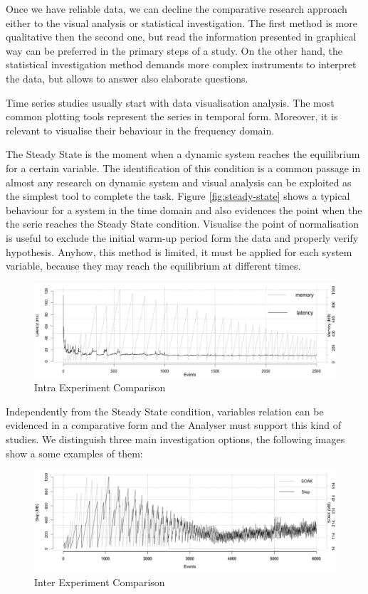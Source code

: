 Once we have reliable data, we can decline the comparative research approach either to the visual analysis or statistical investigation. The first method is more qualitative then the second one, but read the information presented in graphical way can be preferred in the primary steps of a study. On the other hand, the statistical investigation method demands more complex instruments to interpret the data, but allows to answer also elaborate questions.

Time series studies usually start with data visualisation analysis. The most common plotting tools represent the series in temporal form. Moreover, it is relevant to visualise their behaviour in the frequency domain. 

The Steady State is the moment when a dynamic system reaches the equilibrium for a certain variable. The identification of this condition is a common passage in almost any research on dynamic system and visual analysis can be exploited as the simplest tool to complete the task. Figure \ref{fig:steady-state} shows a typical behaviour for a system in the time domain and also evidences the point when the the serie reaches the Steady State condition. Visualise the point of normalisation is useful to exclude the initial warm-up period form the data and properly verify hypothesis. Anyhow, this method is limited, it must be applied for each system variable, because they may reach the equilibrium at different times.

\begin{figure}[tbh]
  \centering
	\includegraphics[width=0.80\linewidth]{images/comp-intra}
	\caption{Intra Experiment Comparison} 
  	\label{fig:comp-intra}
\end{figure}

Independently from the Steady State condition, variables relation can be evidenced in a comparative form and the Analyser must support this kind of studies. We distinguish three main investigation options, the following images show a some examples of them:

\begin{figure}[tbh]
  \centering
	\includegraphics[width=0.80\linewidth]{images/comp-inter}
	\caption{Inter Experiment Comparison} 
  	\label{fig:comp-inter}
\end{figure}

